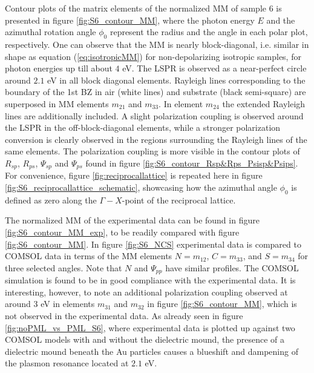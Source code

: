 Contour plots of the matrix elements of the normalized MM of sample 6 is presented in figure \ref{fig:S6_contour_MM}, where the photon energy $E$ and the azimuthal rotation angle $\phi_0$ represent the radius and the angle in each polar plot, respectively. One can observe that the MM is nearly block-diagonal, i.e. similar in shape as equation (\ref{eq:isotropicMM}) for non-depolarizing isotropic samples, for photon energies up till about $4$ eV. The LSPR is observed as a near-perfect circle around $2.1$ eV in all block diagonal elements. Rayleigh lines corresponding to the boundary of the 1st BZ in air (white lines) and substrate (black semi-square) are superposed in MM elements $m_{21}$ and $m_{33}$. In element $m_{24}$ the extended Rayleigh lines are additionally included. A slight polarization coupling is observed around the LSPR in the off-block-diagonal elements, while a stronger polarization conversion is clearly observed in the regions surrounding the Rayleigh lines of the same elements. The polarization coupling is more visible in the contour plots of $R_{sp}$, $R_{ps}$, $\Psi_{sp}$ and $\Psi_{ps}$ found in figure \ref{fig:S6_contour_Rsp&Rps_Psisp&Psips}. For convenience, figure \ref{fig:reciprocallattice} is repeated here in figure \ref{fig:S6_reciprocallattice_schematic}, showcasing how the azimuthal angle $\phi_0$ is defined as zero along the $\Gamma-X$-point of the reciprocal lattice.

The normalized MM of the experimental data can be found in figure \ref{fig:S6_contour_MM_exp}, to be readily compared with figure \ref{fig:S6_contour_MM}. In figure \ref{fig:S6_NCS} experimental data is compared to COMSOL data in terms of the MM elements $N=m_{12}$, $C=m_{33}$, and $S=m_{34}$ for three selected angles. Note that $N$ and $\Psi_{pp}$ have similar profiles. The COMSOL simulation is found to be in good compliance with the experimental data. It is interesting, however, to note an additional polarization coupling observed at around $3$ eV in elements $m_{31}$ and $m_{32}$ in figure \ref{fig:S6_contour_MM}, which is not observed in the experimental data. As already seen in figure \ref{fig:noPML_vs_PML_S6}, where experimental data is plotted up against two COMSOL models with and without the dielectric mound, the presence of a dielectric mound beneath the Au particles causes a blueshift and dampening of the plasmon resonance located at $2.1$ eV. 

